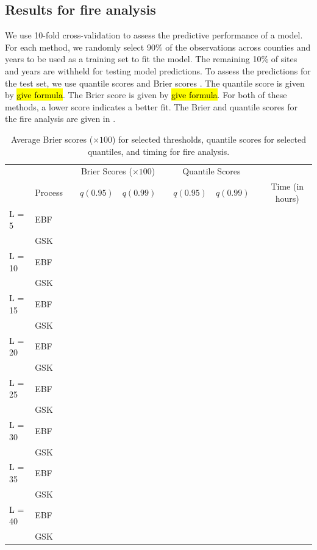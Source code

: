 \documentclass[11pt]{article}
\begin{document}
\subsection{Results for fire analysis}\label{ebs:results-fire}
We use 10-fold cross-validation to assess the predictive performance of a model.
For each method, we randomly select 90\% of the observations across counties and years to be used as a training set to fit the model.
The remaining 10\% of sites and years are withheld for testing model predictions.
To assess the predictions for the test set, we use quantile scores and Brier scores \citep{Gneiting2007}.
The quantile score is given by \hl{give formula}.
The Brier score is given by \hl{give formula}.
For both of these methods, a lower score indicates a better fit.
The Brier and quantile scores for the fire analysis are given in .


\begin{table}[htbp]
\caption{Average Brier scores ($\times 100$) for selected thresholds, quantile scores for selected quantiles, and timing for fire analysis.}
\label{ebtbl:firescores}
\centering
  \begin{tabular}{llcrrcrrcc}
  \toprule
  & & \phantom{ab} & \multicolumn{2}{c}{Brier Scores ($\times 100$)} & \phantom{abc} & \multicolumn{2}{c}{Quantile Scores} & \phantom{ab} & \\
  \cmidrule{4-5} \cmidrule{7-8}
  & Process && $q(0.95)$ & $q(0.99)$ && $q(0.95)$ & $q(0.99)$ && Time (in hours)\\
  \midrule
  L = 5  & EBF &&  &  &&  &  && \\
         & GSK &&  &  &&  &  && \\
  \midrule
  L = 10 & EBF &&  &  &&  &  && \\
         & GSK &&  &  &&  &  && \\
  \midrule
  L = 15 & EBF &&  &  &&  &  && \\
         & GSK &&  &  &&  &  && \\
  \midrule
  L = 20 & EBF &&  &  &&  &  && \\
         & GSK &&  &  &&  &  && \\
  \midrule
  L = 25 & EBF &&  &  &&  &  && \\
         & GSK &&  &  &&  &  && \\
  \midrule
  L = 30 & EBF &&  &  &&  &  && \\
         & GSK &&  &  &&  &  && \\
  \midrule
  L = 35 & EBF &&  &  &&  &  && \\
         & GSK &&  &  &&  &  && \\
  \midrule
  L = 40 & EBF &&  &  &&  &  && \\
         & GSK &&  &  &&  &  && \\
  \bottomrule
	\end{tabular}
\end{table}
\end{document}
